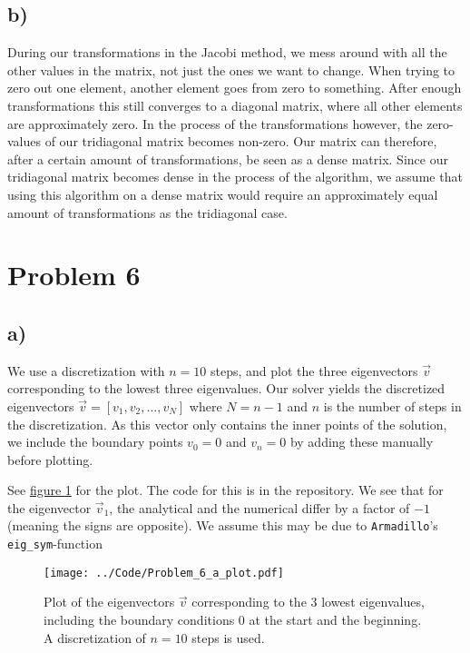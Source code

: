 \documentclass[english,notitlepage]{article}  %
\begin{document}
\subsection*{b)}
During our transformations in the Jacobi method, we mess around with all the
other values in the matrix, not just the ones we want to change. When trying to
zero out one element, another element goes from zero to something. After enough
transformations this still converges to a diagonal matrix, where all other
elements are approximately zero. In the process of the transformations however,
the zero-values of our tridiagonal matrix becomes non-zero. Our matrix can
therefore, after a certain amount of transformations, be seen as a dense matrix.
Since our tridiagonal matrix becomes dense in the process of the algorithm, we
assume that using this algorithm on a dense matrix would require an
approximately equal amount of transformations as the tridiagonal case.

\section*{Problem 6}
\subsection*{a)}
We use a discretization with $n=10$ steps, and plot the three eigenvectors $\vec{v}$ corresponding to the lowest three eigenvalues. Our solver yields the discretized eigenvectors $\vec{v} = [ v_1, v_2, ..., v_{N} ]$ where $N=n-1$ and $n$ is the number of steps in the discretization. As this vector only contains the inner points of the solution, we include the boundary points $v_0 = 0$ and $v_n = 0$ by adding these manually before plotting.

See \hyperref[fig:6aplot]{figure \ref*{fig:6aplot}} for the plot. The code for this is in the repository. We see that for the eigenvector $\vec{v}_1$, the analytical and the numerical differ by a factor of $-1$ (meaning the signs are opposite). We assume this may be due to \lstinline{Armadillo}'s \lstinline{eig_sym}-function

\begin{figure}[H]
    \centering
    \texttt{[image: ../Code/Problem\_6\_a\_plot.pdf]}
    \caption{Plot of the eigenvectors $\vec{v}$ corresponding to the 3 lowest eigenvalues, including the boundary conditions 0 at the start and the beginning. A discretization of $n=10$ steps is used.}
    \label{fig:6aplot}
\end{figure}
\end{document}
